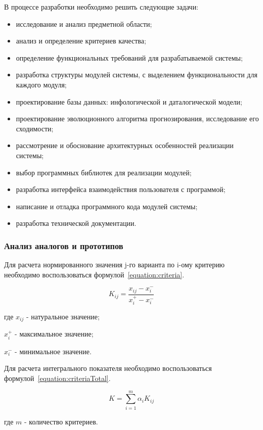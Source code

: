 В процессе разработки необходимо решить следующие задачи:
\begin{itemize}
\item исследование и анализ предметной области;
\item анализ и определение критериев качества;
\item определение функциональных требований для разрабатываемой системы;
\item разработка структуры модулей системы, с выделением функциональности для каждого модуля;
\item проектирование базы данных: инфологической и даталогической модели;
\item проектирование эволюционного алгоритма прогнозирования, исследование его сходимости;
\item рассмотрение и обоснование архитектурных особенностей реализации системы;
\item выбор программных библиотек для реализации модулей;
\item разработка интерфейса взаимодействия пользователя с программой;
\item написание и отладка программного кода модулей системы;
\item разработка технической документации.
\end{itemize}

\subsubsection{Анализ аналогов и прототипов}

Для расчета нормированного значения j-го варианта по i-ому критерию необходимо
воспользоваться формулой~\ref{equation:criteria}.

\begin{equation}
\label{equation:criteria}
K_{ij} = \frac{x_{ij} - x_i^-}{x_i^+ - x_i^-}
\end{equation}
\begin{ESKDexplanation}
\item[где ] $x_{ij}$ - натуральное значение;
\item       $x_i^+$ - максимальное значение;
\item       $x_i^-$ - минимальное значение.
\end{ESKDexplanation}

Для расчета интегрального показателя необходимо воспользоваться формулой~\ref{equation:criteriaTotal}.

\begin{equation}
\label{equation:criteriaTotal}
K = \sum_{i=1}^m \alpha_i K_{ij}
\end{equation}
\begin{ESKDexplanation}
\item[где ] $m$ - количество критериев.
\end{ESKDexplanation}

